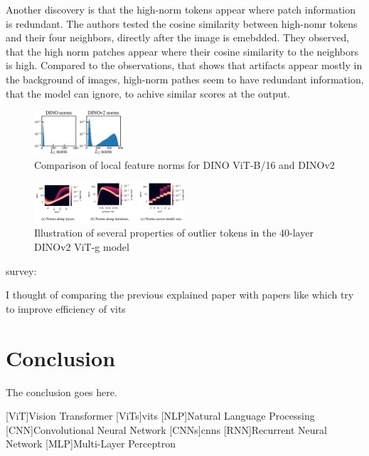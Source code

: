 \documentclass[conference]{IEEEtran}
\begin{document}
Another discovery is that the high-norm tokens appear where patch information is redundant. The authors tested the cosine similarity between high-nomr tokens and their four neighbors, directly after the image is emebdded. They observed, that the high norm patches appear where their cosine similarity to the neighbors is high. Compared to the observations, that shows that artifacts appear mostly in the background of images, high-norm pathes seem to have redundant information, that the model can ignore, to achive similar scores at the output. 


\begin{figure}
  \centering
  \includegraphics[width=0.3\textwidth]{figures/artifact-norm.png}
  \caption{Comparison of local feature norms for DINO ViT-B/16 and DINOv2 \cite{registers}}
  \label{fig:artifacts-norm}
\end{figure}

\begin{figure}
  \centering
  \includegraphics[width=0.5\textwidth]{figures/artifact-layers.png}
  \caption{Illustration of several properties of outlier tokens in the 40-layer DINOv2 ViT-g model \cite{registers}}
  \label{fig:artifacts-layer}
\end{figure}








survey: \cite{10.1145/3586074} 

I thought of comparing the previous explained paper \cite{darcet2024visiontransformersneedregisters} with papers like \cite{wen2024efficientvisionlanguagemodelssummarizing} \cite{Yin_2022_CVPR} \cite{10.1007/978-3-031-20053-3_30} \cite{ryoo2022tokenlearner8learnedtokens} \cite{Liu2024-lm} which try to improve efficiency of \ac{vit}s 

\section{Conclusion}
The conclusion goes here.

\printbibliography


\begin{acronym}
	[ViT]{Vision Transformer}
  [ViTs]{\ac{vit}s}
  [NLP]{Natural Language Processing}
  [CNN]{Convolutional Neural Network}
  [CNNs]{\acp{cnn}}
  [RNN]{Recurrent Neural Network}
  [MLP]{Multi-Layer Perceptron}
\end{acronym}


\end{document}
